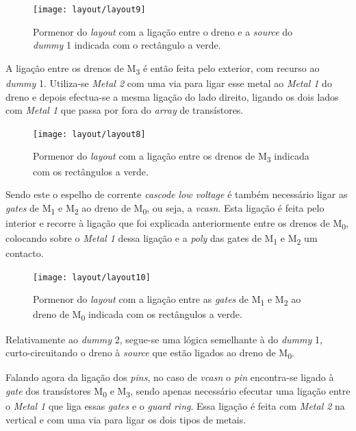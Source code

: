 \documentclass[11pt]{article}
\numberwithin{equation}{section}
\begin{document}
\begin{figure}[H]
	\centering
	\texttt{[image: layout/layout9]}
	\vspace{-0.8em}
	\caption{Pormenor do \textit{layout} com a ligação entre o dreno e a \textit{source} do \textit{dummy} 1 indicada com o rectângulo a verde.}
	\vspace{-0.8em}
\end{figure}

A ligação entre os drenos de M\textsubscript{3} é então feita pelo exterior, com recurso ao \textit{dummy} 1. Utiliza-se \textit{Metal 2} com uma via para ligar esse metal ao \textit{Metal 1} do dreno e depois efectua-se a mesma ligação do lado direito, ligando os dois lados com \textit{Metal 1} que passa por fora do \textit{array} de transístores.
 
\begin{figure}[H]
	\centering
	\texttt{[image: layout/layout8]}
	\vspace{-0.8em}
	\caption{Pormenor do \textit{layout} com a ligação entre os drenos de M\textsubscript{3} indicada com os rectângulos a verde.}
	\vspace{-0.8em}
\end{figure}

Sendo este o espelho de corrente \textit{cascode low voltage} é também necessário ligar as \textit{gates} de M\textsubscript{1} e M\textsubscript{2} ao dreno de M\textsubscript{0}, ou seja, a \textit{vcasn}. Esta ligação é feita pelo interior e recorre à ligação que foi explicada anteriormente entre os drenos de M\textsubscript{0}, colocando sobre o \textit{Metal 1} dessa ligação e a \textit{poly} das gates de M\textsubscript{1} e M\textsubscript{2} um contacto. 

\begin{figure}[H]
	\centering
	\texttt{[image: layout/layout10]}
	\vspace{-0.8em}
	\caption{Pormenor do \textit{layout} com a ligação entre as \textit{gates} de M\textsubscript{1} e M\textsubscript{2} ao dreno de M\textsubscript{0} indicada com os rectângulos a verde.}
	\vspace{-0.8em}
\end{figure}

Relativamente ao \textit{dummy} 2, segue-se uma lógica semelhante à do \textit{dummy} 1, curto-circuitando o dreno à \textit{source} que estão ligados ao dreno de  M\textsubscript{0}.

Falando agora da ligação dos \textit{pins}, no caso de \textit{vcasn} o \textit{pin} encontra-se ligado à \textit{gate} dos transístores M\textsubscript{0} e M\textsubscript{3}, sendo apenas necessário efecutar uma ligação entre o \textit{Metal 1} que liga essas \textit{gates} e o \textit{guard ring}. Essa ligação é feita com \textit{Metal 2} na vertical e com uma via para ligar os dois tipos de metais.
\end{document}
